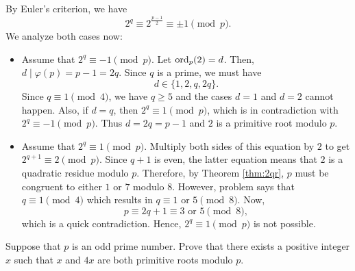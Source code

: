 \documentclass{subfile}
\begin{document}
	\begin{solution}
		By Euler's criterion, we have
		\[2^q \equiv 2^{\frac{p-1}{2}} \equiv \pm 1 \pmod{p}.\]
		 We analyze both cases now:
			\begin{itemize}
				\item Assume that $2^q \equiv -1 \pmod p$. Let $\operatorname{ord}_p(2)=d$. Then, $d\mid \varphi(p)=p-1=2q$. Since $q$ is a prime, we must have $$d \in \{1,2,q,2q\}.$$ Since $q \equiv 1 \pmod 4$, we have $q \geq 5$ and the cases $d=1$ and $d=2$ cannot happen. Also, if $d=q$, then $2^q \equiv 1 \pmod p$, which is in contradiction with $2^q \equiv -1 \pmod p$. Thus $d=2q=p-1$ and $2$ is a primitive root modulo $p$.
				\item Assume that $2^q \equiv 1 \pmod{p}$. Multiply both sides of this equation by $2$ to get $2^{q+1} \equiv 2 \pmod p$. Since $q+1$ is even, the latter equation means that $2$ is a quadratic residue modulo $p$. Therefore, by Theorem \ref{thm:2qr}, $p$ must be congruent to either $1$ or $7$ modulo $8$. However, problem says that $q \equiv 1 \pmod 4$ which results in $q \equiv 1$ or $5 \pmod 8$. Now,
				\[p \equiv 2q +1 \equiv 3 \text{ or } 5 \pmod 8,\]
				which is a quick contradiction. Hence, $2^q \equiv 1 \pmod{p}$ is not possible.
			\end{itemize}

	\end{solution}

	\begin{problem}
		Suppose that $p$ is an odd prime number. Prove that there exists a positive integer $x$ such that $x$ and $4x$ are both primitive roots modulo $p$.
	\end{problem}
\end{document}
